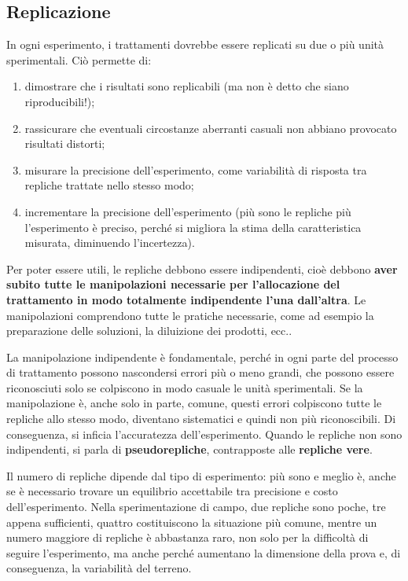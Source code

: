 \documentclass[
  12pt,
]{book}
\providecommand{\tightlist}{%
  \setlength{\itemsep}{0pt}\setlength{\parskip}{0pt}}
\begin{document}
\hypertarget{replicazione}{%
\subsection{Replicazione}\label{replicazione}}

In ogni esperimento, i trattamenti dovrebbe essere replicati su due o più unità sperimentali. Ciò permette di:

\begin{enumerate}
\def\labelenumi{\arabic{enumi}.}
\tightlist
\item
  dimostrare che i risultati sono replicabili (ma non è detto che siano riproducibili!);
\item
  rassicurare che eventuali circostanze aberranti casuali non abbiano provocato risultati distorti;
\item
  misurare la precisione dell'esperimento, come variabilità di risposta tra repliche trattate nello stesso modo;
\item
  incrementare la precisione dell'esperimento (più sono le repliche più l'esperimento è preciso, perché si migliora la stima della caratteristica misurata, diminuendo l'incertezza).
\end{enumerate}

Per poter essere utili, le repliche debbono essere indipendenti, cioè debbono \textbf{aver subito tutte le manipolazioni necessarie per l'allocazione del trattamento in modo totalmente indipendente l'una dall'altra}. Le manipolazioni comprendono tutte le pratiche necessarie, come ad esempio la preparazione delle soluzioni, la diluizione dei prodotti, ecc..

La manipolazione indipendente è fondamentale, perché in ogni parte del processo di trattamento possono nascondersi errori più o meno grandi, che possono essere riconosciuti solo se colpiscono in modo casuale le unità sperimentali. Se la manipolazione è, anche solo in parte, comune, questi errori colpiscono tutte le repliche allo stesso modo, diventano sistematici e quindi non più riconoscibili. Di conseguenza, si inficia l'accuratezza dell'esperimento. Quando le repliche non sono indipendenti, si parla di \textbf{pseudorepliche}, contrapposte alle \textbf{repliche vere}.

Il numero di repliche dipende dal tipo di esperimento: più sono e meglio è, anche se è necessario trovare un equilibrio accettabile tra precisione e costo dell'esperimento. Nella sperimentazione di campo, due repliche sono poche, tre appena sufficienti, quattro costituiscono la situazione più comune, mentre un numero maggiore di repliche è abbastanza raro, non solo per la difficoltà di seguire l'esperimento, ma anche perché aumentano la dimensione della prova e, di conseguenza, la variabilità del terreno.
\end{document}
